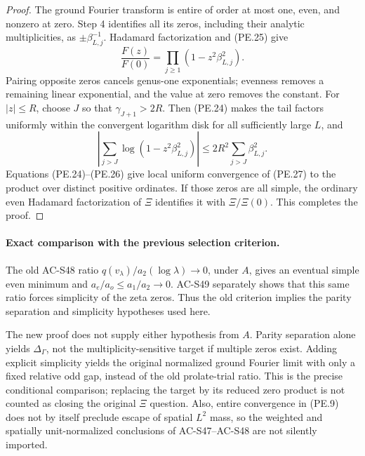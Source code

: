 \begin{proof}
The ground Fourier transform is entire of order at most one,
even, and nonzero at zero.  Step 4 identifies all its zeros,
including their analytic multiplicities, as
\(\pm\beta_{L,j}^{-1}\).
Hadamard factorization and (PE.25) give
\[
 \frac{F(z)}{F(0)}
                =\prod_{j\ge1}(1-z^2\beta_{L,j}^2).
 \tag{PE.27}
\]
Pairing opposite zeros cancels genus-one exponentials;
evenness removes a remaining linear exponential, and the value
at zero removes the constant.
For \(|z|\le R\), choose \(J\) so that
\(\gamma_{J+1}>2R\).
Then (PE.24) makes the tail factors uniformly within the
convergent logarithm disk for all sufficiently large \(L\), and
\[
 \left|\sum_{j>J}\log(1-z^2\beta_{L,j}^2)\right|
                   \le 2R^2\sum_{j>J}\beta_{L,j}^2 .
\]
Equations (PE.24)--(PE.26) give local uniform convergence of
(PE.27) to the product over distinct positive ordinates.
If those zeros are all simple, the ordinary even Hadamard
factorization of \(\Xi\) identifies it with \(\Xi/\Xi(0)\).
This completes the proof.
\end{proof}

\paragraph{Exact comparison with the previous selection criterion.}
The old AC-S48 ratio \(q(v_\lambda)/a_2(\log\lambda)\to0\),
under \(A\), gives an eventual simple even minimum and
\(a_e/a_o\le a_1/a_2\to0\).  AC-S49 separately shows that
this same ratio forces simplicity of the zeta zeros.
Thus the old criterion implies the parity separation and
simplicity hypotheses used here.

The new proof does not supply either hypothesis from \(A\).
Parity separation alone yields \(\Delta_\Gamma\), not the
multiplicity-sensitive target if multiple zeros exist.
Adding explicit simplicity yields the original normalized
ground Fourier limit with only a fixed relative odd gap,
instead of the old prolate-trial ratio.
This is the precise conditional comparison; replacing the
target by its reduced zero product is not counted as closing
the original \(\Xi\) question.  Also, entire convergence in
(PE.9) does not by itself preclude escape of spatial \(L^2\)
mass, so the weighted and spatially unit-normalized conclusions
of AC-S47--AC-S48 are not silently imported.

